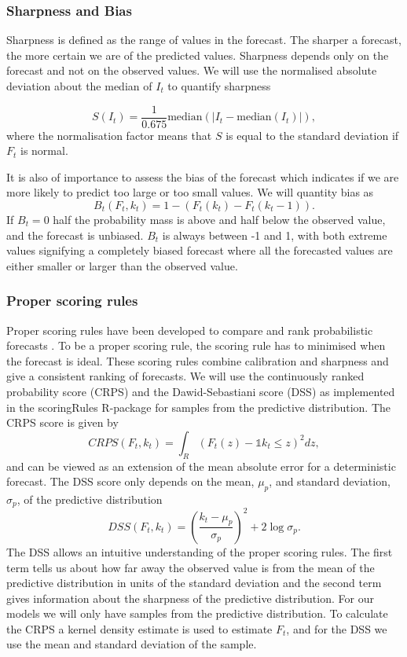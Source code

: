 \documentclass[12pt]{article}
\begin{document}
\subsubsection{Sharpness and Bias}
Sharpness is defined as the range of values in the forecast. The sharper a forecast, the more certain we are of the predicted values. Sharpness depends only on the forecast and not on the observed values. We will use the normalised absolute deviation about the median of $I_t$ to quantify sharpness

\[ S(I_t) = \frac{1}{0.675} \text{median}(|I_t - \text{median}(I_t)|),\]
where the normalisation factor means that $S$ is equal to the standard deviation if $F_t$ is normal.

It is also of importance to assess the bias of the forecast which indicates if we are more likely to predict too large or too small values. We will quantity bias as
\[B_t(F_t, k_t) = 1 - (F_t(k_t) - F_t(k_t - 1)).\]
If $B_t=0$ half the probability mass is above and half below the observed value, and the forecast is unbiased. $B_t$ is always between -1 and 1, with both extreme values signifying a completely biased forecast where all the forecasted values are either smaller or larger than the observed value.

\subsubsection{Proper scoring rules}
Proper scoring rules have been developed to compare and rank probabilistic forecasts \cite{gneitingStrictlyProperScoring2007}. To be a proper scoring rule, the scoring rule has to minimised when the forecast is ideal. These scoring rules combine calibration and sharpness and give a consistent ranking of forecasts. We will use the continuously ranked probability score (CRPS) and the Dawid-Sebastiani score (DSS) as implemented in the scoringRules R-package \cite{jordanEvaluatingProbabilisticForecasts2018} for samples from the predictive distribution. The CRPS score is given by 
\[CRPS(F_t,k_t) = \int_R(F_t(z) - \mathds{1}{k_t \leq z})^2 dz, \] and can be viewed as an extension of the mean absolute error for a deterministic forecast. The DSS score only depends on the mean, $\mu_p$, and standard deviation, $\sigma_p$, of the predictive distribution
\[DSS(F_t, k_t) = \left(\frac{k_t- \mu_p}{\sigma_p}\right)^2 + 2\log\sigma_p.\]
The DSS allows an intuitive understanding of the proper scoring rules. The first term tells us about how far away the observed value is from the mean of the predictive distribution in units of the standard deviation and the second term gives information about the sharpness of the predictive distribution. For our models we will only have samples from the predictive distribution. To calculate the CRPS a kernel density estimate is used to estimate $F_t$, and for the DSS we use the mean and standard deviation of the sample. 
\end{document}
